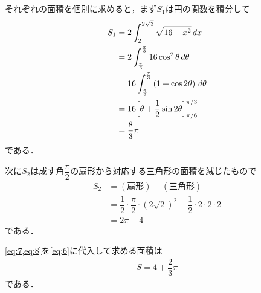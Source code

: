 \documentclass[../../main.tex]{subfiles}
\begin{document}
それぞれの面積を個別に求めると，まず$S_1$は円の関数を積分して
\begin{align}
  S_1
  &= 2 \int_{2}^{2\sqrt{3}} \sqrt{16-x^2} \, dx \\
  &= 2 \int_{\frac{\pi}{6}}^{\frac{\pi}{3}} 16 \cos^2 \theta \, d\theta \\
  &= 16 \int_{\frac{\pi}{6}}^{\frac{\pi}{3}} \left(1+\cos 2\theta\right)\, d\theta \\
  &= 16 \Bigl[ \theta + \dfrac{1}{2} \sin 2\theta \Bigr]_{\pi/6}^{\pi/3} \\
  &= \dfrac{8}{3}\pi \label{eq:7}
\end{align}
である．

次に$S_2$は成す角$\dfrac{\pi}{2}$の扇形から対応する三角形の面積を減じたもので
\begin{align}
  S_2
  &= (\text{扇形}) - (\text{三角形}) \\
  &= \dfrac{1}{2} \cdot \dfrac{\pi}{2} \cdot (2\sqrt{2})^2 - \dfrac{1}{2} \cdot 2 \cdot 2 \cdot 2 \\
  &= 2\pi - 4 \label{eq:8}
\end{align}
である．

\cref{eq:7,eq:8}を\cref{eq:6}に代入して求める面積は
\begin{align}
  S = 4 + \dfrac{2}{3}\pi
\end{align}
である．

\newpage
\end{document}
